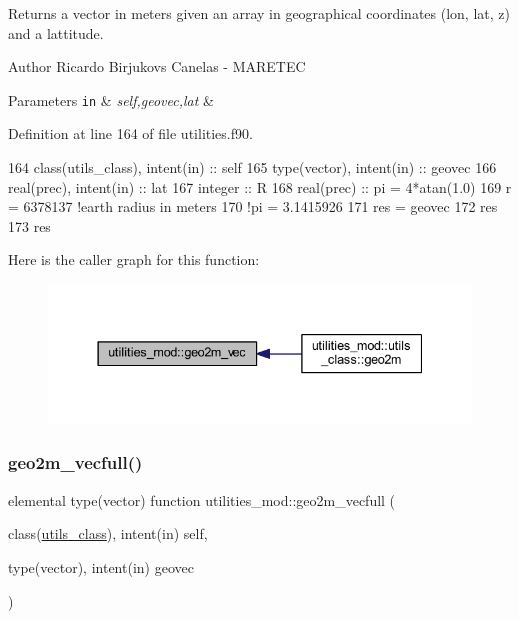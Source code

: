 Returns a vector in meters given an array in geographical coordinates (lon, lat, z) and a lattitude. 

\begin{DoxyAuthor}{Author}
Ricardo Birjukovs Canelas -\/ M\+A\+R\+E\+T\+EC 
\end{DoxyAuthor}

\begin{DoxyParams}[1]{Parameters}
\mbox{\tt in}  & {\em self,geovec,lat} & \\
\hline
\end{DoxyParams}


Definition at line 164 of file utilities.\+f90.


\begin{DoxyCode}
164     \textcolor{keywordtype}{class}(utils\_class), \textcolor{keywordtype}{intent(in)} :: self
165     \textcolor{keywordtype}{type}(vector), \textcolor{keywordtype}{intent(in)} :: geovec
166     \textcolor{keywordtype}{real(prec)}, \textcolor{keywordtype}{intent(in)} :: lat
167     \textcolor{keywordtype}{integer} :: R
168     \textcolor{keywordtype}{real(prec)} :: pi = 4*atan(1.0)
169     r = 6378137 \textcolor{comment}{!earth radius in meters}
170     \textcolor{comment}{!pi = 3.1415926}
171     res = geovec
172     res%
173     res%
\end{DoxyCode}
Here is the caller graph for this function\+:\nopagebreak
\begin{figure}[H]
\begin{center}
\leavevmode
\includegraphics[width=337pt]{namespaceutilities__mod_a3d3d0e1568b178cd3e0bb8013642946c_icgraph}
\end{center}
\end{figure}
\mbox{\label{namespaceutilities__mod_ad0d629861220adba81d8622aa16f39ab}} 
\subsubsection{\texorpdfstring{geo2m\+\_\+vecfull()}{geo2m\_vecfull()}}
{\footnotesize\ttfamily elemental type(vector) function utilities\+\_\+mod\+::geo2m\+\_\+vecfull (\begin{DoxyParamCaption}\item[{class(\mbox{\hyperlink{structutilities__mod_1_1utils__class}{utils\+\_\+class}}), intent(in)}]{self,  }\item[{type(vector), intent(in)}]{geovec }\end{DoxyParamCaption})\hspace{0.3cm}{\ttfamily [private]}}



